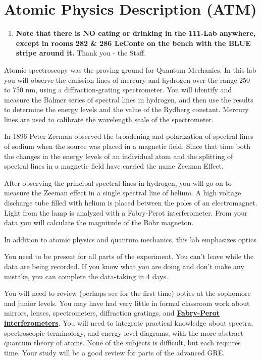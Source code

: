 \documentclass{../lab}
\begin{document}
\maketitle

\tableofcontents

\newpage
\section{Atomic Physics Description (ATM)}

\begin{enumerate}
    \item \textbf{Note that there is NO eating or drinking in the 111-Lab anywhere, except in rooms 282 \& 286 LeConte on the bench with the BLUE stripe around it.} Thank you - the Staff.

\end{enumerate}

Atomic spectroscopy was the proving ground for Quantum Mechanics. In this lab you will observe the emission lines of mercury and hydrogen over the range 250 to 750 nm, using a diffraction-grating spectrometer. You will identify and measure the Balmer series of spectral lines in hydrogen, and then use the results to determine the energy levels and the value of the Rydberg constant. Mercury lines are used to calibrate the wavelength scale of the spectrometer.

In 1896 Peter Zeeman observed the broadening and polarization of spectral lines of sodium when the source was placed in a magnetic field. Since that time both the changes in the energy levels of an individual atom and the splitting of spectral lines in a magnetic field have carried the name Zeeman Effect.

After observing the principal spectral lines in hydrogen, you will go on to measure the Zeeman effect in a single spectral line of helium. A high voltage discharge tube filled with helium is placed between the poles of an electromagnet. Light from the lamp is analyzed with a Fabry-Perot interferometer. From your data you will calculate the magnitude of the Bohr magneton.

In addition to atomic physics and quantum mechanics, this lab emphasizes optics.

You need to be present for all parts of the experiment. You can't leave while the data are being recorded. If you know what you are doing and don't make any mistake, you can complete the data-taking in 4 days.

You will need to review (perhaps see for the first time) optics at the sophomore and junior levels. You may have had very little in formal classroom work about mirrors, lenses, spectrometers, diffraction gratings, and \href{http://experimentationlab.berkeley.edu/sites/default/files/ATM/Etalons\_TechNote-3pages.pdf}{\textbf{Fabry-Perot interferometers}}. You will need to integrate practical knowledge about spectra, spectroscopic terminology, and energy level diagrams, with the more abstract quantum theory of atoms. None of the subjects is difficult, but each requires time. Your study will be a good review for parts of the advanced GRE.
\end{document}
